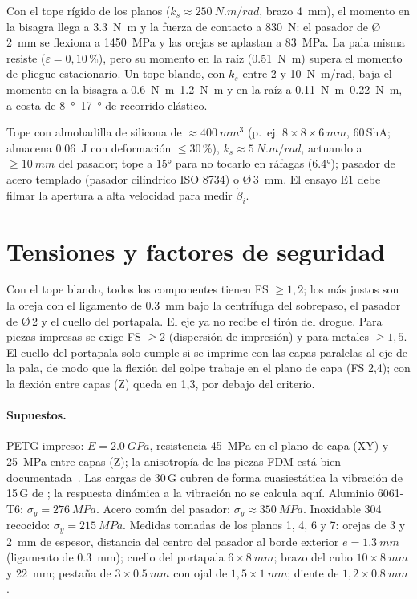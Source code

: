Con el tope rígido de los planos ($k_s\approx\SI{250}{N.m/rad}$, brazo \SI{4}{mm}), el
momento en la bisagra llega a \SI{3.3}{N.m} y la fuerza de contacto a \SI{830}{N}: el
pasador de Ø\,\SI{2}{mm} se flexiona a \SI{1450}{MPa} y las orejas se aplastan a
\SI{83}{MPa}. La pala misma resiste ($\varepsilon=0{,}10$\,\%), pero su momento en la raíz
(\SI{0.51}{N.m}) supera el momento de pliegue estacionario. Un tope blando, con
$k_s$ entre 2 y \SI{10}{N.m/rad}, baja el momento en la bisagra a \SIrange{0.6}{1.2}{N.m} y en
la raíz a \SIrange{0.11}{0.22}{N.m}, a costa de \SIrange{8}{17}{\degree} de recorrido
elástico.

\begin{resultado}
Tope con almohadilla de silicona de $\approx\SI{400}{mm^3}$ (p.~ej. $8\times8\times\SI{6}{mm}$,
60\,ShA; almacena \SI{0.06}{J} con deformación $\le30$\,\%), $k_s\approx\SI{5}{N.m/rad}$, actuando a
$\ge\SI{10}{mm}$ del pasador; tope a $\ang{+15}$ para no tocarlo en
ráfagas (\ang{6.4}); pasador de acero templado (pasador cilíndrico ISO 8734) o Ø\,\SI{3}{mm}.
El ensayo E1 debe filmar la apertura a alta velocidad para medir $\dot\beta_i$.
\end{resultado}

\section{Tensiones y factores de seguridad}\label{sec:estructura-fs}

Con el tope blando, todos los componentes tienen FS $\ge1{,}2$; los más justos son la
oreja con el ligamento de \SI{0.3}{mm} bajo la centrífuga del sobrepaso, el pasador de Ø\,2
y el cuello del portapala. El eje ya no recibe el tirón del drogue. Para piezas impresas se exige FS $\ge2$ (dispersión de impresión) y
para metales $\ge1{,}5$. El cuello del portapala solo cumple si se imprime con las capas
paralelas al eje de la pala, de modo que la flexión del golpe trabaje en el plano de capa
(FS 2,4); con la flexión entre capas (Z) queda en 1,3, por debajo del criterio.

\paragraph{Supuestos.} PETG impreso: $E=\SI{2.0}{GPa}$, resistencia \SI{45}{MPa} en el plano
de capa (XY) y \SI{25}{MPa} entre capas (Z); la anisotropía de las piezas FDM está bien
documentada~\cite{estructura-ahn2002}. Las cargas de 30\,G cubren de forma cuasiestática la
vibración de 15\,G de ; la respuesta dinámica a la vibración no se calcula aquí. Aluminio 6061-T6: $\sigma_y=\SI{276}{MPa}$. Acero
común del pasador: $\sigma_y\approx\SI{350}{MPa}$. Inoxidable 304 recocido:
$\sigma_y=\SI{215}{MPa}$. Medidas tomadas de los planos 1, 4, 6 y 7: orejas de 3 y \SI{2}{mm} de espesor,
distancia del centro del pasador al borde exterior $e=\SI{1.3}{mm}$ (ligamento de
\SI{0.3}{mm}); cuello del portapala $6\times\SI{8}{mm}$; brazo del cubo
$10\times\SI{8}{mm}$ y \SI{22}{mm}; pestaña de $3\times\SI{0.5}{mm}$ con ojal de
$1{,}5\times\SI{1}{mm}$; diente de $1{,}2\times\SI{0.8}{mm}$.

